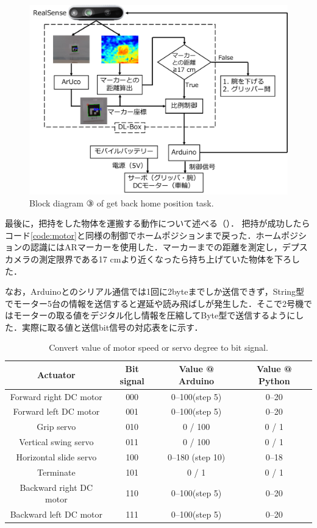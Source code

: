 \begin{figure}[H]
    \centering
    \includegraphics[width=\linewidth]{figure/chapter4/2号機制御図_AR-3}
    \caption{Block diagram ③ of get back home position task.}
    \label{fig:2号機AR}
\end{figure}

最後に，把持をした物体を運搬する動作について述べる（）．
把持が成功したらコード\ref{code:motor}と同様の制御でホームポジションまで戻った．ホームポジションの認識にはARマーカーを使用した．マーカーまでの距離を測定し，デプスカメラの測定限界である17 cmより近くなったら持ち上げていた物体を下ろした．

なお，Arduinoとのシリアル通信では1回に2byteまでしか送信できず，String型でモーター5台の情報を送信すると遅延や読み飛ばしが発生した．そこで2号機ではモーターの取る値をデジタル化し情報を圧縮してByte型で送信するようにした．実際に取る値と送信bit信号の対応表をに示す．

\begin{table}[H]
    \centering
    \caption{Convert value of motor speed or servo degree to bit signal.}
    \begin{tabular}{cccc}\toprule
        Actuator & Bit signal & Value @ Arduino & Value @ Python \\ \midrule
        Forward right DC motor & 000 & 0--100(step 5) & 0--20  \\ 
        Forward left DC motor & 001 & 0--100(step 5) & 0--20 \\ 
        Grip servo & 010 & 0 / 100 & 0 / 1\\ 
        Vertical swing servo & 011 & 0 / 100 & 0 / 1\\ 
        Horizontal slide servo & 100 & 0--180 (step 10) & 0--18 \\ 
        Terminate & 101 & 0 / 1 & 0 / 1 \\ 
        Backward right DC motor & 110 & 0--100(step 5) & 0--20 \\ 
        Backward left DC motor & 111 & 0--100(step 5) & 0--20 \\ \bottomrule
    \end{tabular} 
    \label{tab:2号機信号表}
\end{table}

